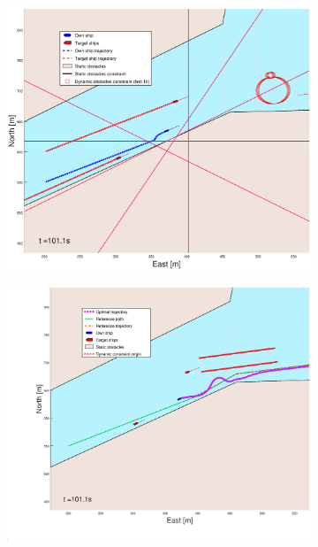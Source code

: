 \clearpage
\begin{figure}[!b] %
    \begin{subfigure}[b]{0.49\textwidth}
        \centering
        \includegraphics[width=\textwidth]{Images/Figures/Trheimfjord/_Simple_1fig1_time=101}
    \end{subfigure}
    \hfill
    \begin{subfigure}[b]{0.499\textwidth}
        \centering
        \includegraphics[width=\textwidth]{Images/Figures/Trheimfjord/_Simple_1fig999_time=101}

\end{subfigure}
\end{figure}
